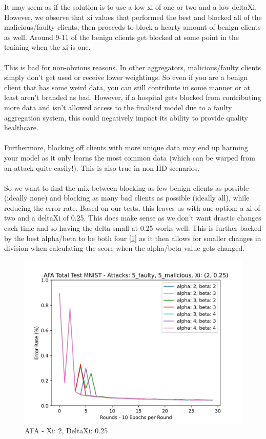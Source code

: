 It may seem as if the solution is to use a low xi of one or two and a low deltaXi. 
However, we observe that xi values that performed the best and blocked all of the malicious/faulty clients, then proceeds to block a hearty amount of benign clients as well.
Around 9-11 of the benign clients get blocked at some point in the training when the xi is one.
\\ \\
This is bad for non-obvious reasons. 
In other aggregators, malicious/faulty clients simply don't get used or receive lower weightings. 
So even if you are a benign client that has some weird data, you can still contribute in some manner or at least aren't branded as bad. 
However, if a hospital gets blocked from contributing more data and isn't allowed access to the finalised model due to a faulty aggregation system, this could negatively impact its ability to provide quality healthcare.
\\ \\
Furthermore, blocking off clients with more unique data may end up harming your model as it only learns the most common data (which can be warped from an attack quite easily!). This is also true in non-IID scenarios.
\\ \\
So we want to find the mix between blocking as few benign clients as possible (ideally none) and blocking as many bad clients as possible (ideally all), while reducing the error rate.
Based on our tests, this leaves us with one option: a xi of two and a deltaXi of 0.25.
This does make sense as we don't want drastic changes each time and so having the delta small at 0.25 works well. 
This is further backed by the best alpha/beta to be both four [\ref{fig:best_afa}] as it then allows for smaller changes in division when calculating the score when the alpha/beta value gets changed.

\begin{figure}[htbp]
	\centering
    \includegraphics[scale=0.7]{initial/graphs/best_afa.png}
	\caption{AFA - Xi: 2, DeltaXi: 0.25}
	\label{fig:best_afa}
\end{figure}


